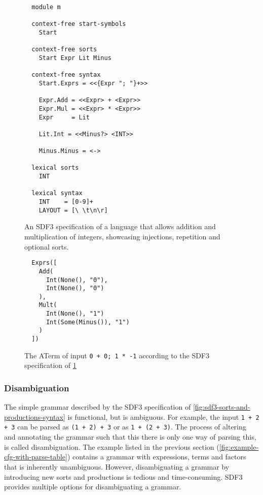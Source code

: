       \begin{figure}
        \begin{verbatim}
  module m

  context-free start-symbols
    Start
  
  context-free sorts
    Start Expr Lit Minus
  
  context-free syntax
    Start.Exprs = <<{Expr "; "}+>>
  
    Expr.Add = <<Expr> + <Expr>>
    Expr.Mul = <<Expr> * <Expr>>
    Expr     = Lit
  
    Lit.Int = <<Minus?> <INT>>
  
    Minus.Minus = <->
  
  lexical sorts
    INT
  
  lexical syntax
    INT    = [0-9]+
    LAYOUT = [\ \t\n\r]
        \end{verbatim}
        \caption{\label{fig:sdf3-syntax-injection-repetition-optional}An SDF3 specification of a language that allows addition and multiplication of integers, showcasing injections, repetition and optional sorts.}
      \end{figure}

      \begin{figure}
        \begin{verbatim}
  Exprs([
    Add(
      Int(None(), "0"),
      Int(None(), "0")
    ),
    Mult(
      Int(None(), "1")
      Int(Some(Minus()), "1")
    )
  ])
        \end{verbatim}
        \caption{\label{fig:example-aterm-injections-etc}The ATerm of input \texttt{0 + 0; 1 * -1} according to the SDF3 specification of \cref{fig:sdf3-syntax-injection-repetition-optional}}
      \end{figure}

      \subsubsection{\label{subsubsec:sdf3-disambiguation}Disambiguation}

        The simple grammar described by the SDF3 specification of \cref{fig:sdf3-sorts-and-productions-syntax} is functional, but is ambiguous. For example, the input \texttt{1 + 2 + 3} can be parsed as \texttt{(1 + 2) + 3} or as \texttt{1 + (2 + 3)}. The process of altering and annotating the grammar such that this there is only one way of parsing this, is called disambiguation. The example listed in the previous section (\cref{fig:example-cfg-with-parse-table}) contains a grammar with expressions, terms and factors that is inherently unambiguous. However, disambiguating a grammar by introducing new sorts and productions is tedious and time-consuming. SDF3 provides multiple options for disambiguating a grammar.

